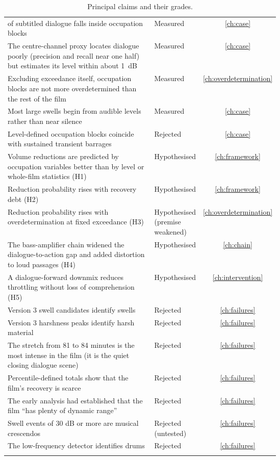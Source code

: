 \begin{longtable}{p{0.62\linewidth}lc}
\resSubInBlocksShare{} of subtitled dialogue falls inside occupation blocks & Measured & \ref{ch:case} \\
The centre-channel proxy locates dialogue poorly (precision and recall near one half) but estimates its level within about 1~dB & Measured & \ref{ch:case} \\
Excluding exceedance itself, occupation blocks are not more overdetermined than the rest of the film & Measured & \ref{ch:overdetermination} \\
Most large swells begin from audible levels rather than near silence & Measured & \ref{ch:case} \\
Level-defined occupation blocks coincide with sustained transient barrages & Rejected & \ref{ch:case} \\
Volume reductions are predicted by occupation variables better than by level or whole-film statistics (H1) & Hypothesised & \ref{ch:framework} \\
Reduction probability rises with recovery debt (H2) & Hypothesised & \ref{ch:framework} \\
Reduction probability rises with overdetermination at fixed exceedance (H3) & Hypothesised (premise weakened) & \ref{ch:overdetermination} \\
The bass-amplifier chain widened the dialogue-to-action gap and added distortion to loud passages (H4) & Hypothesised & \ref{ch:chain} \\
A dialogue-forward downmix reduces throttling without loss of comprehension (H5) & Hypothesised & \ref{ch:intervention} \\
Version 3 swell candidates identify swells & Rejected & \ref{ch:failures} \\
Version 3 harshness peaks identify harsh material & Rejected & \ref{ch:failures} \\
The stretch from 81 to 84 minutes is the most intense in the film (it is the quiet closing dialogue scene) & Rejected & \ref{ch:failures} \\
Percentile-defined totals show that the film's recovery is scarce & Rejected & \ref{ch:failures} \\
The early analysis had established that the film ``has plenty of dynamic range'' & Rejected & \ref{ch:failures} \\
Swell events of 30 dB or more are musical crescendos & Rejected (untested) & \ref{ch:failures} \\
The low-frequency detector identifies drums & Rejected & \ref{ch:failures} \\
\bottomrule
\caption{Principal claims and their grades.}\label{tab:grades}
\end{longtable}

